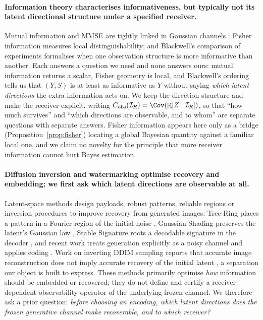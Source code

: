 \documentclass{article}
\theoremstyle{definition}
\DeclareMathOperator{\Exp}{\mathbb{E}}
\newcommand{\Cobs}{C_{\mathrm{obs}}}
\begin{document}
\paragraph{Information theory characterises informativeness, but typically not its latent
directional structure under a specified receiver.}
Mutual information and MMSE are tightly linked in Gaussian channels
\citep{guo2005immse}; Fisher information measures local distinguishability; and
Blackwell's comparison of experiments \citep{blackwell1953} formalises when one
observation structure is more informative than another. Each answers a question we need
and none answers ours: mutual information returns a scalar, Fisher geometry is local, and
Blackwell's ordering tells us that $(Y,S)$ is at least as informative as $Y$ without
saying \emph{which latent directions} the extra information acts on. We keep the
direction structure and make the receiver explicit, writing
$\Cobs(\mathcal I_R)=\Cov(\Exp[Z\mid\mathcal I_R])$, so that ``how much survives'' and
``which directions are observable, and to whom'' are separate questions with separate
answers. Fisher information appears here only as a bridge
(Proposition~\ref{prop:fisher}) locating a global Bayesian quantity against a familiar
local one, and we claim no novelty for the principle that more receiver information cannot
hurt Bayes estimation.

\paragraph{Diffusion inversion and watermarking optimise recovery and embedding; we first
ask which latent directions are observable at all.}
Latent-space methods design payloads, robust patterns, reliable regions or inversion
procedures to improve recovery from generated images: Tree-Ring places a pattern in a
Fourier region of the initial noise \citep{wen2023treering}, Gaussian Shading preserves
the latent's Gaussian law \citep{yang2024gaussianshading}, Stable Signature roots a
decodable signature in the decoder \citep{fernandez2023stablesignature}, and recent work
treats generation explicitly as a noisy channel and applies coding
\citep{zhang2026gaussianshannon,chang2026maxmark}. Work on inverting DDIM sampling
reports that accurate image reconstruction does not imply accurate recovery of the initial
latent \citep{zeng2026inverting}, a separation our object is built to express. These
methods primarily optimise \emph{how} information should be embedded or recovered; they do
not define and certify a receiver-dependent observability operator of the underlying frozen
channel. We therefore ask a prior question: \emph{before choosing an encoding, which latent
directions does the frozen generative channel make recoverable, and to which receiver?}
\end{document}

